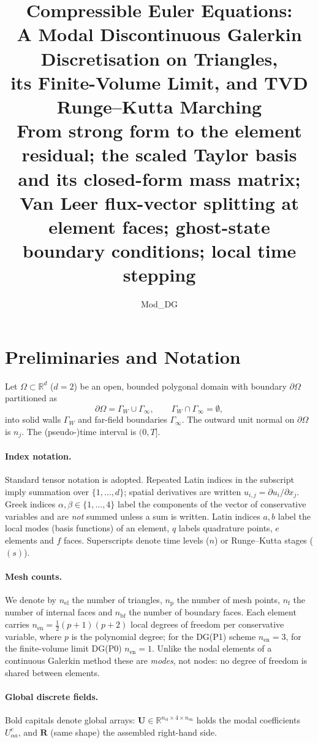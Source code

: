 \documentclass[11pt,a4paper]{article}
\title{\textbf{Compressible Euler Equations:\\ A Modal Discontinuous Galerkin Discretisation on Triangles,\\ its Finite-Volume Limit, and TVD Runge--Kutta Marching}\\[0.5em]
\normalsize From strong form to the element residual; the scaled Taylor basis and its closed-form mass matrix; Van Leer flux-vector splitting at element faces; ghost-state boundary conditions; local time stepping}
\author{Mod\_DG}
\date{}
\theoremstyle{remark}
\theoremstyle{definition}
\newcommand{\U}{\mathbf{U}}
\newcommand{\R}{\mathbf{R}}
\begin{document}
\maketitle
\tableofcontents
\newpage

\section{Preliminaries and Notation}

Let $\Omega\subset\mathbb{R}^d$ ($d=2$) be an open, bounded polygonal domain with boundary $\partial\Omega$ partitioned as
\[
\partial\Omega=\Gamma_W\cup\Gamma_\infty,\qquad \Gamma_W\cap\Gamma_\infty=\emptyset,
\]
into solid walls $\Gamma_W$ and far-field boundaries $\Gamma_\infty$. The outward unit normal on $\partial\Omega$ is $n_j$. The (pseudo-)time interval is $(0,T]$.

\paragraph{Index notation.} Standard tensor notation is adopted. Repeated Latin indices in the subscript imply summation over $\{1,\dots,d\}$; spatial derivatives are written $u_{i,j}=\partial u_i/\partial x_j$. Greek indices $\alpha,\beta\in\{1,\dots,4\}$ label the components of the vector of conservative variables and are \emph{not} summed unless a sum is written. Latin indices $a,b$ label the local modes (basis functions) of an element, $q$ labels quadrature points, $e$ elements and $f$ faces. Superscripts denote time levels ($n$) or Runge--Kutta stages ($(s)$).

\paragraph{Mesh counts.} We denote by $n_{\mathrm{el}}$ the number of triangles, $n_{\mathrm{p}}$ the number of mesh points, $n_{\mathrm{f}}$ the number of internal faces and $n_{\mathrm{bf}}$ the number of boundary faces. Each element carries $n_{\mathrm{en}}=\tfrac12(p+1)(p+2)$ local degrees of freedom per conservative variable, where $p$ is the polynomial degree; for the DG(P1) scheme $n_{\mathrm{en}}=3$, for the finite-volume limit DG(P0) $n_{\mathrm{en}}=1$. Unlike the nodal elements of a continuous Galerkin method these are \emph{modes}, not nodes: no degree of freedom is shared between elements.

\paragraph{Global discrete fields.} Bold capitals denote global arrays: $\U\in\mathbb{R}^{n_{\mathrm{el}}\times 4\times n_{\mathrm{en}}}$ holds the modal coefficients $U^e_{\alpha a}$, and $\R$ (same shape) the assembled right-hand side.
\end{document}
